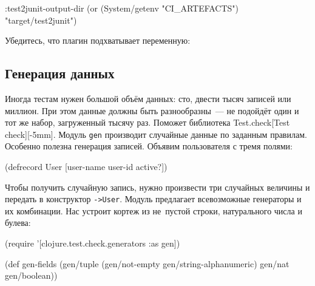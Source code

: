\begin{english}
  \begin{clojure}
:test2junit-output-dir (or (System/getenv "CI_ARTEFACTS")
                           "target/test2junit")
  \end{clojure}
\end{english}

\noindent
Убедитесь, что плагин подхватывает переменную:

\begin{english}
\end{english}

\subsection{Генерация данных}


Иногда тестам нужен большой объём данных: сто, двести тысяч записей или
миллион. При этом данные должны быть разнообразны~--- не подойдёт один и тот же
набор, загруженный тысячу раз. Поможет библиотека
Test.check[Test check][-5mm]. Модуль \verb|gen|
производит случайные данные по заданным правилам. Особенно полезна генерация
записей. Объявим пользователя с тремя полями:

\begin{english}
  \begin{clojure}
(defrecord User [user-name user-id active?])
  \end{clojure}
\end{english}

Чтобы получить случайную запись, нужно произвести три случайных величины и
передать в конструктор \verb|->User|. Модуль предлагает всевозможные генераторы
и их комбинации. Нас устроит кортеж из не~пустой строки, натурального числа и
булева:

\begin{english}
  \begin{clojure}
(require '[clojure.test.check.generators :as gen])

(def gen-fields
  (gen/tuple (gen/not-empty gen/string-alphanumeric)
             gen/nat
             gen/boolean))
  \end{clojure}
\end{english}

